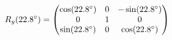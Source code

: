 \documentclass[preview]{standalone}
\begin{document}
\begin{align*}
\special{dvisvgm:raw <g id='unique000'>}R_y(22.8^\circ) = \begin{pmatrix} \cos(22.8^\circ) & 0 & -\sin(22.8^\circ) \\ 0 & 1 & 0 \\ \sin(22.8^\circ) & 0 & \cos(22.8^\circ) \end{pmatrix}\special{dvisvgm:raw </g>}
\end{align*}
\end{document}
